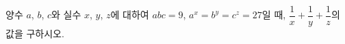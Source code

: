 양수 $a$, $b$, $c$와 실수 $x$, $y$, $z$에 대하여 $abc=9$, $a^x=b^y=c^z=27$일 때, $\dfrac{1}{x}+\dfrac{1}{y}+\dfrac{1}{z}$의 값을 구하시오.
